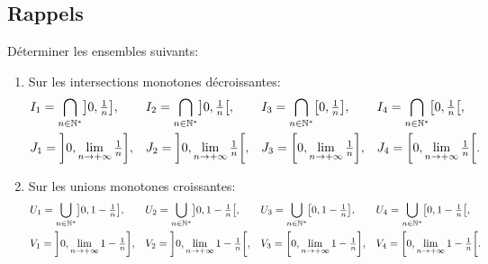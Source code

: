 \subsection*{Rappels}

\begin{td-exo}
    Déterminer les ensembles suivants:
    \begin{enumerate}
        \item Sur les intersections monotones décroissantes:
        \begin{equation*}
            \begin{aligned}
                &I_1 = \bigcap_{n\in\mathbb{N}^*} \mathopen{}\left]0,\tfrac 1 n\right]\mathclose{},&
                &I_2 = \bigcap_{n\in\mathbb{N}^*} \mathopen{}\left]0,\tfrac 1 n\right[\mathclose{},&
                &I_3 = \bigcap_{n\in\mathbb{N}^*} \mathopen{}\left[0,\tfrac 1 n\right]\mathclose{},&
                &I_4 = \bigcap_{n\in\mathbb{N}^*} \mathopen{}\left[0,\tfrac 1 n\right[\mathclose{},\\
                &J_1 = \mathopen{}\left]0,\lim_{n\to +\infty} \tfrac 1 n\right]\mathclose{},&
                &J_2 = \mathopen{}\left]0,\lim_{n\to +\infty} \tfrac 1 n\right[\mathclose{},&
                &J_3 = \mathopen{}\left[0,\lim_{n\to +\infty} \tfrac 1 n\right]\mathclose{},&
                &J_4 = \mathopen{}\left[0,\lim_{n\to +\infty} \tfrac 1 n\right[\mathclose{}.
            \end{aligned}
        \end{equation*}
        \item Sur les unions monotones croissantes:
        \begin{equation*}
            \begin{aligned}
                &U_1 = \bigcup_{n\in\mathbb{N}^*} \mathopen{}\left]0, 1 - \tfrac 1 n\right]\mathclose{},&
                &U_2 = \bigcup_{n\in\mathbb{N}^*} \mathopen{}\left]0,1 - \tfrac 1 n\right[\mathclose{},&
                &U_3 = \bigcup_{n\in\mathbb{N}^*} \mathopen{}\left[0, 1 - \tfrac 1 n\right]\mathclose{},&
                &U_4 = \bigcup_{n\in\mathbb{N}^*} \mathopen{}\left[0,1 - \tfrac 1 n\right[\mathclose{},\\
                &V_1 = \mathopen{}\left]0, \lim_{n\to+\infty} 1 - \tfrac 1 n\right]\mathclose{},&
                &V_2 = \mathopen{}\left]0, \lim_{n\to+\infty} 1 - \tfrac 1 n\right[\mathclose{},&
                &V_3 = \mathopen{}\left[0, \lim_{n\to+\infty} 1 - \tfrac 1 n\right]\mathclose{},&
                &V_4 = \mathopen{}\left[0, \lim_{n\to+\infty} 1 - \tfrac 1 n\right[\mathclose{}.
            \end{aligned}
        \end{equation*}
    \end{enumerate}
\end{td-exo}
